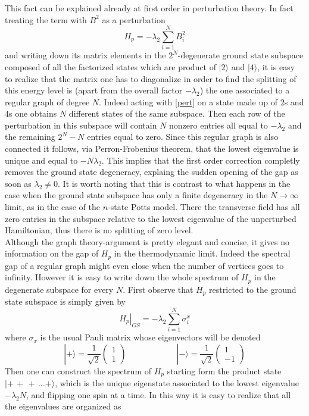 \documentclass[aps,pra,superscriptaddress]{revtex4}
\newcommand\be            {\begin{equation}}
\newcommand\ee            {\end{equation}}
\renewcommand{\(}{\left(}
\renewcommand{\)}{\right)}
\renewcommand{\[}{\left[}
\renewcommand{\]}{\right]}
\newcommand\ket[1]{|#1\rangle}
\begin{document}
\noindent
This fact can be explained already at first order in perturbation theory. In fact treating the term with $B^2$ as a perturbation
\be \label{pert}
H_p = -\lambda_2 \sum_{i=1}^N B^2_i
\ee
and writing down its matrix elements in the $2^N$-degenerate ground state subspace composed of all the factorized states which are product of $\ket{2}$ and $\ket{4}$, it is easy to realize that the matrix one has to diagonalize in order to find the splitting of this energy level is (apart from the overall factor $-\lambda_2$) the one associated to a regular graph of degree $N$. Indeed acting with \eqref{pert} on a state made up of $2$s and $4$s one obtains $N$ different states of the same subspace. Then each row of the perturbation in this subspace will contain $N$ nonzero entries all equal to $-\lambda_2$ and the remaining $2^N - N$ entries equal to zero. Since this regular graph is also connected it follows, via Perron-Frobenius theorem, that the lowest eigenvalue is unique and equal to $-N \lambda_2$. This implies that the first order correction completly removes the ground state degeneracy, explaing the sudden opening of the gap as soon as $\lambda_2 \ne 0$. It is worth noting that this is contrast to what happens in the case when the ground state subspace has only a finite degeneracy in the $N \to \infty$ limit, as in the case of the $n$-state Potts model. There the transverse field has all zero entries in the subspace relative to the lowest eigenvalue of the unperturbed Hamiltonian, thus there is no splitting of zero level.\\
Although the graph theory-argument is pretty elegant and concise, it gives no information on the gap of $H_p$ in the thermodynamic limit. Indeed the spectral gap of a regular graph might even close when the number of vertices goes to infinity. However it is easy to write down the whole spectrum of $H_p$ in the degenerate subspace for every $N$. First observe that $H_p$ restricted to the ground state subspace is simply given by
\be 
\left. H_p \right|_{GS} = -\lambda_2 \sum_{i=1}^N \sigma^x_i
\ee
where $\sigma_x$ is the usual Pauli matrix whose eigenvectors will be denoted
\be 
\ket{ + } = \frac{1}{\sqrt{2}} \begin{pmatrix}
1 \\ 1
\end{pmatrix}
\qquad \qquad \qquad 
\ket{ - } = \frac{1}{\sqrt{2}} \begin{pmatrix}
1 \\ -1
\end{pmatrix}
\ee
Then one can construct the spectrum of $H_p$ starting form the product state $\ket{ + \, + \, + \, \dots + }$, which is the unique eigenstate associated to the lowest eigenvalue $-\lambda_2 N$, and flipping one spin at a time. In this way it is easy to realize that all the eigenvalues are organized as
\end{document}
